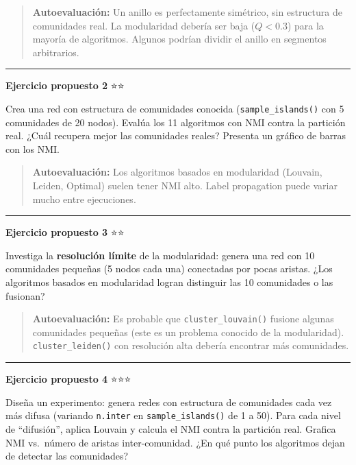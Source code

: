 \documentclass[
  letterpaper,
  DIV=11,
  numbers=noendperiod]{scrreprt}
\begin{document}
\begin{quote}
\textbf{Autoevaluación:} Un anillo es perfectamente simétrico, sin
estructura de comunidades real. La modularidad debería ser baja
(\(Q < 0.3\)) para la mayoría de algoritmos. Algunos podrían dividir el
anillo en segmentos arbitrarios.
\end{quote}

\begin{center}\rule{0.5\linewidth}{0.5pt}\end{center}

\textbf{Ejercicio propuesto 2} ⭐⭐

Crea una red con estructura de comunidades conocida
(\texttt{sample\_islands()} con 5 comunidades de 20 nodos). Evalúa los
11 algoritmos con NMI contra la partición real. ¿Cuál recupera mejor las
comunidades reales? Presenta un gráfico de barras con los NMI.

\begin{quote}
\textbf{Autoevaluación:} Los algoritmos basados en modularidad (Louvain,
Leiden, Optimal) suelen tener NMI alto. Label propagation puede variar
mucho entre ejecuciones.
\end{quote}

\begin{center}\rule{0.5\linewidth}{0.5pt}\end{center}

\textbf{Ejercicio propuesto 3} ⭐⭐

Investiga la \textbf{resolución límite} de la modularidad: genera una
red con 10 comunidades pequeñas (5 nodos cada una) conectadas por pocas
aristas. ¿Los algoritmos basados en modularidad logran distinguir las 10
comunidades o las fusionan?

\begin{quote}
\textbf{Autoevaluación:} Es probable que \texttt{cluster\_louvain()}
fusione algunas comunidades pequeñas (este es un problema conocido de la
modularidad). \texttt{cluster\_leiden()} con resolución alta debería
encontrar más comunidades.
\end{quote}

\begin{center}\rule{0.5\linewidth}{0.5pt}\end{center}

\textbf{Ejercicio propuesto 4} ⭐⭐⭐

Diseña un experimento: genera redes con estructura de comunidades cada
vez más difusa (variando \texttt{n.inter} en \texttt{sample\_islands()}
de 1 a 50). Para cada nivel de ``difusión'', aplica Louvain y calcula el
NMI contra la partición real. Grafica NMI vs.~número de aristas
inter-comunidad. ¿En qué punto los algoritmos dejan de detectar las
comunidades?
\end{document}
